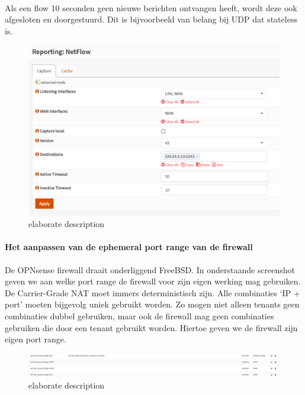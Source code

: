 \paragraph{}
Als een flow 10 seconden geen nieuwe berichten ontvangen heeft, wordt deze ook afgesloten en doorgestuurd. Dit is bijvoorbeeld van belang bij UDP dat stateless is.

\begin{figure}[!htbp]
    \includegraphics[width=\textwidth]{./graphics/opnsense_netflow_conf.PNG}
    \caption[OPNsense NetFlow configuratie]{elaborate description}
    \label{fig:FirewallNetflow}
\end{figure}

\paragraph{Het aanpassen van de ephemeral port range van de firewall}
De OPNsense firewall draait onderliggend FreeBSD. In onderstaande screenshot geven we aan welke port range de firewall voor zijn eigen werking mag gebruiken. De Carrier-Grade NAT moet immers deterministisch zijn. Alle combinaties ‘IP + port’ moeten bijgevolg uniek gebruikt worden. Zo mogen niet alleen tenants geen combinaties dubbel gebruiken, maar ook de firewall mag geen combinaties gebruiken die door een tenant gebruikt worden. Hiertoe geven we de firewall zijn eigen port range.

\begin{figure}[!htbp]
    \includegraphics[width=\textwidth]{graphics/opnsense_tunables_portrange.PNG}
    \caption[OPNsense tunables portrange]{elaborate description}
    \label{fig:FirewallTunables}
\end{figure}

